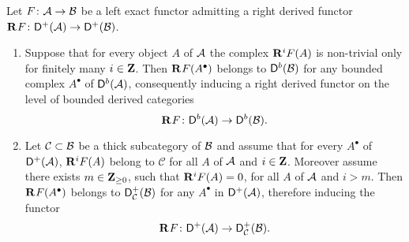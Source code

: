 \begin{proposition}
    \label{Spectral sequences for derived cats}
    Let $F \colon \mathcal A \to \mathcal B$ be a left exact functor admitting a right derived functor $\mathbf{R}^{}F\colon \mathsf{D}^+(\mathcal A) \to \mathsf{D}^+(\mathcal B)$. 
    \begin{enumerate}[label = (\roman*)]
        \item{Suppose that for every object $A$ of $\mathcal A$ the complex $\mathbf{R}^{i}F(A)$ is non-trivial only for finitely many $i \in \mathbf Z$. Then $\mathbf{R}^{}F(A^\bullet)$ belongs to $\mathsf{D}^b(\mathcal B)$ for any bounded complex $A^\bullet$ of $\mathsf{D}^b(\mathcal A)$, consequently inducing a right derived functor on the level of bounded derived categories
        \[
            \mathbf{R}^{}F \colon \mathsf{D}^b(\mathcal A) \to \mathsf{D}^b(\mathcal B).
        \]} \label{Bounded on objects implies bounded on complexes}
        \item{Let $\mathcal C \subset \mathcal B$ be a thick subcategory of $\mathcal B$ and assume that for every $A^\bullet$ of $\mathsf{D}^+(\mathcal A)$, $\mathbf{R}^{i}F(A)$ belong to $\mathcal C$ for all $A$ of $\mathcal A$ and $i \in \mathbf Z$. Moreover assume there exists $m \in \mathbf Z_{\geq 0}$, such that $\mathbf{R}^{i}F(A) = 0$, for all $A$ of $\mathcal A$ and $i > m$. Then $\mathbf{R}^{}F(A^\bullet)$ belongs to $\mathsf{D}^+_\mathcal{C}(\mathcal B)$ for any $A^\bullet$ in $\mathsf{D}^+(\mathcal A)$, therefore inducing the functor
        \[
            \mathbf{R}^{}F\colon \mathsf{D}^+(\mathcal A) \to \mathsf{D}^+_\mathcal{C}(\mathcal B).
        \]
        } \label{Cohomology in a thick subcategory}
    \end{enumerate}
\end{proposition}

